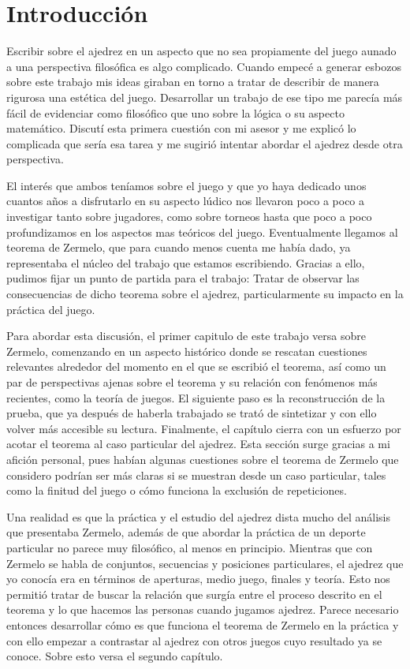 \documentclass[twoside,openright,12pt,a4paper,spanish]{book}
\begin{document}
\tableofcontents %

\chapter*{Introducción}

Escribir sobre el ajedrez en un aspecto que no sea propiamente del juego aunado a una perspectiva filosófica es algo complicado. Cuando empecé a generar esbozos sobre este trabajo mis ideas giraban en torno a tratar de describir de manera rigurosa una estética del juego. Desarrollar un trabajo de ese tipo me parecía más fácil de evidenciar como filosófico que uno sobre la lógica o su aspecto matemático. Discutí esta primera cuestión con mi asesor y me explicó lo complicada que sería esa tarea y me sugirió intentar abordar el ajedrez desde otra perspectiva. 

El interés que ambos teníamos sobre el juego y que yo haya dedicado unos cuantos años a disfrutarlo en su aspecto lúdico nos llevaron poco a poco a investigar tanto sobre jugadores, como sobre torneos hasta que poco a poco profundizamos en los aspectos mas teóricos del juego.
Eventualmente llegamos al teorema de Zermelo, que para cuando menos cuenta me había dado, ya representaba el núcleo del trabajo que estamos escribiendo. Gracias a ello, pudimos fijar un punto de partida para el trabajo: Tratar de observar las consecuencias de dicho teorema sobre el ajedrez, particularmente su impacto en la práctica del juego.

Para abordar esta discusión, el primer capitulo de este trabajo versa sobre Zermelo, comenzando en un aspecto hist\'orico donde se rescatan cuestiones relevantes alrededor del momento en el que se escribi\'o el teorema, as\'i como un par de perspectivas ajenas sobre el teorema y su relaci\'on con fen\'omenos m\'as recientes, como la teor\'ia de juegos. El siguiente paso es la reconstrucci\'on de la prueba, que ya despu\'es de haberla trabajado se trat\'o de sintetizar y con ello volver m\'as accesible su lectura. Finalmente, el cap\'itulo cierra con un esfuerzo por acotar el teorema al caso particular del ajedrez. Esta secci\'on surge gracias a mi afici\'on personal, pues hab\'ian algunas cuestiones sobre el teorema de Zermelo que considero podr\'ian ser m\'as claras si se muestran desde un caso particular, tales como la finitud del juego o c\'omo funciona la exclusi\'on de repeticiones.

Una realidad es que la práctica y el estudio del ajedrez dista mucho del análisis que presentaba Zermelo, además de que abordar la práctica de un deporte particular no parece muy filosófico, al menos en principio. Mientras que con Zermelo se habla de conjuntos, secuencias y posiciones particulares, el ajedrez que yo conocía era en términos de aperturas, medio juego, finales y teoría. Esto nos permitió tratar de buscar la relación que surgía entre el proceso descrito en el teorema y lo que hacemos las personas cuando jugamos ajedrez. Parece necesario entonces desarrollar c\'omo es que funciona el teorema de Zermelo en la pr\'actica y con ello empezar a contrastar al ajedrez con otros juegos cuyo resultado ya se conoce. Sobre esto versa el segundo cap\'itulo. 
\end{document}
